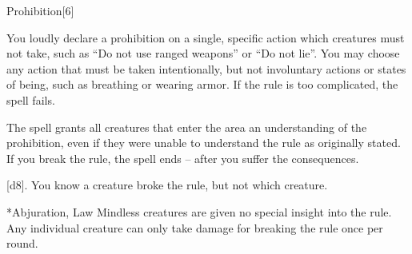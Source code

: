 \begin{spellsection}{Prohibition}[6]
    \begin{spellheader}
    \end{spellheader}
    \begin{spellcontent}
        \begin{spelltargetinginfo}
        \end{spelltargetinginfo}
        \begin{spelleffects}
            \spelleffect You loudly declare a prohibition on a single, specific action which creatures must not take, such as ``Do not use ranged weapons'' or ``Do not lie''. You may choose any action that must be taken intentionally, but not involuntary actions or states of being, such as breathing or wearing armor. If the rule is too complicated, the spell fails.

            The spell grants all creatures that enter the area an understanding of the prohibition, even if they were unable to understand the rule as originally stated. If you break the rule, the spell ends -- after you suffer the consequences.
            \spelldur \durshort
        \end{spelleffects}
    \end{spellcontent}
    \begin{spellsubcontent}
        \begin{spelltargetinginfo}
        \end{spelltargetinginfo}
        \begin{spelleffects}
            \spelleffect \spelldamage{}[d8]. You know a creature broke the rule, but not which creature.
        \end{spelleffects}
    \end{spellsubcontent}
    \begin{spellfooter}
        *{Abjuration, Law}
        \spellnotes Mindless creatures are given no special insight into the rule. Any individual creature can only take damage for breaking the rule once per round.
        \miscastexplode
    \end{spellfooter}
\end{spellsection}

